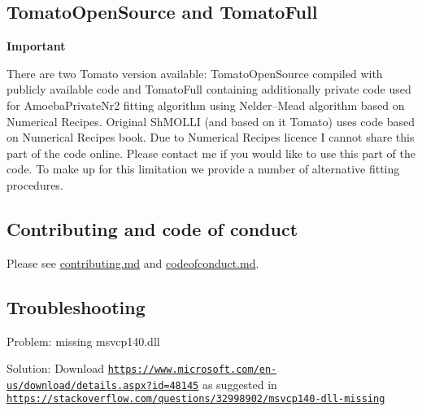 \subsection*{Tomato\-Open\-Source and Tomato\-Full}

{\bfseries Important}

There are two {\ttfamily Tomato} version available\-: {\ttfamily Tomato\-Open\-Source} compiled with publicly available code and {\ttfamily Tomato\-Full} containing additionally private code used for {\ttfamily Amoeba\-Private\-Nr2} fitting algorithm using Nelder–\-Mead algorithm based on Numerical Recipes. Original Sh\-M\-O\-L\-L\-I (and based on it Tomato) uses code based on Numerical Recipes book. Due to Numerical Recipes licence I cannot share this part of the code online. Please contact me if you would like to use this part of the code. To make up for this limitation we provide a number of alternative fitting procedures.

\subsection*{Contributing and code of conduct}

Please see \hyperlink{md_contributing}{contributing.md} and \hyperlink{md_codeofconduct}{codeofconduct.md}.

\subsection*{Troubleshooting}


\begin{DoxyItemize}
\item Problem\-: missing msvcp140.\-dll
\item Solution\-: Download \href{https://www.microsoft.com/en-us/download/details.aspx?id=48145}{\tt https\-://www.\-microsoft.\-com/en-\/us/download/details.\-aspx?id=48145} as suggested in \href{https://stackoverflow.com/questions/32998902/msvcp140-dll-missing}{\tt https\-://stackoverflow.\-com/questions/32998902/msvcp140-\/dll-\/missing} 
\end{DoxyItemize}